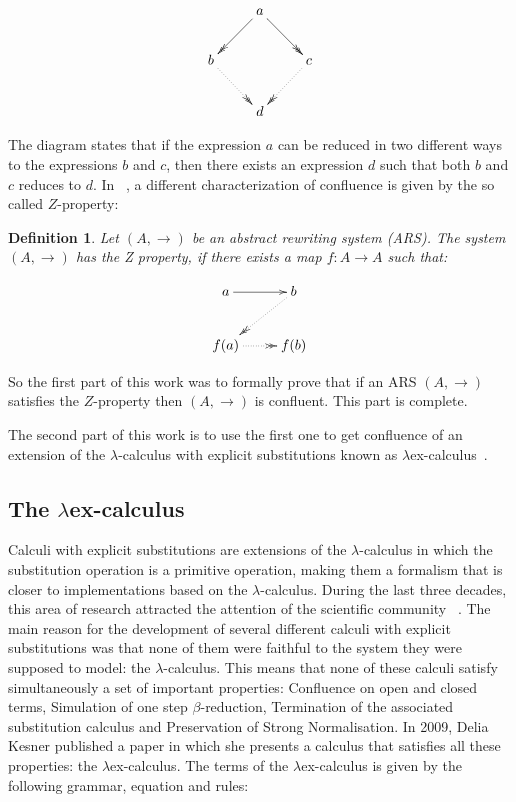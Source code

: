 \documentclass[conference]{IEEEtran}
\newtheorem{definition}{Definition}
\begin{document}
\[
  \xymatrix{
    & a \ar@{->>}[dl] \ar@{->>}[dr] & \\
    b \ar@{.>>}[dr] &  & c \ar@{.>>}[dl] \\
    & d & 
  }
\]

The diagram states that if the expression $a$ can be reduced in two
different ways to the expressions $b$ and $c$, then there exists an
expression $d$ such that both $b$ and $c$ reduces to $d$. In
~\cite{ZPropertyDraft}, a different characterization of confluence is
given by the so called $Z$-property:

\begin{definition}
      Let $(A,\to)$ be an abstract rewriting system (ARS). The system
    $(A,\to)$ has the Z property, if there exists a map $f:A \to A$
    such that:
    
    \[
      \xymatrix{
        a \ar[r] &  b \ar@{.>>}[dl]\\
        f(a) \ar@{.>>}[r] & f(b) \\ 
      }
    \]
\end{definition}

So the first part of this work was to formally prove that if an ARS $(A,\to)$ satisfies the $Z$-property then $(A,\to)$ is confluent. This part is complete. 

The second part of this work is to use the first one to get confluence of an extension of the $\lambda$-calculus with explicit substitutions known as $\lambda$ex-calculus~\cite{kes09}.

\subsection{The $\lambda$ex-calculus }

Calculi with explicit substitutions are extensions of the
$\lambda$-calculus in which the substitution operation is a primitive
operation, making them a formalism that is closer to implementations
based on the $\lambda$-calculus. During the last three decades, this
area of research attracted the attention of the scientific community
~\cite{Lins86,accl91,Bloo95,BeBrLeRD96,jfp,Munoz96,NaWi98,kes09}. The
main reason for the development of several different calculi with
explicit substitutions was that none of them were faithful to the
system they were supposed to model: the $\lambda$-calculus. This means
that none of these calculi satisfy simultaneously a set of important
properties: Confluence on open and closed terms, Simulation of one
step $\beta$-reduction, Termination of the associated substitution
calculus and Preservation of Strong Normalisation. In 2009, Delia
Kesner published a paper in which she presents a calculus that
satisfies all these properties: the $\lambda$ex-calculus. The terms of
the $\lambda$ex-calculus is given by the following grammar, equation and rules:
\end{document}
